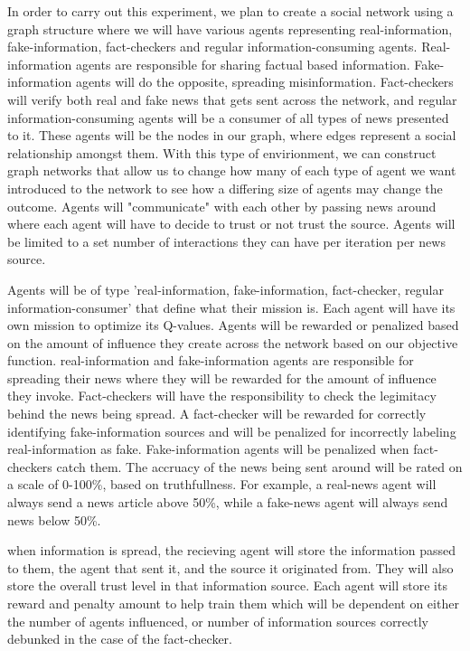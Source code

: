 \documentclass[12pt,twoside]{article}
\begin{document}
In order to carry out this experiment, we plan to create a social network using a graph structure where we will have various agents representing real-information, fake-information, fact-checkers and regular information-consuming agents. Real-information agents are responsible for sharing factual based information. Fake-information agents will do the opposite, spreading misinformation. Fact-checkers will verify both real and fake news that gets sent across the network, and regular information-consuming agents will be a consumer of all types of news presented to it. These agents will be the nodes in our graph, where edges represent a social relationship amongst them. With this type of envirionment, we can construct graph networks that allow us to change how many of each type of agent we want introduced to the network to see how a differing size of agents may change the outcome. Agents will "communicate" with each other by passing news around where each agent will have to decide to trust or not trust the source. Agents will be limited to a set number of interactions they can have per iteration per news source.

Agents will be of type 'real-information, fake-information, fact-checker, regular information-consumer' that define what their mission is. Each agent will have its own mission to optimize its Q-values. Agents will be rewarded or penalized based on the amount of influence they create across the network based on our objective function. real-information and fake-information agents are responsible for spreading their news where they will be rewarded for the amount of influence they invoke. Fact-checkers will have the responsibility to check the legimitacy behind the news being spread. A fact-checker will be rewarded for correctly identifying fake-information sources and will be penalized for incorrectly labeling real-information as fake. Fake-information agents will be penalized when fact-checkers catch them. The accruacy of the news being sent around will be rated on a scale of 0-100\%, based on truthfullness. For example, a real-news agent will always send a news article above 50\%, while a fake-news agent will always send news below 50\%.

when information is spread, the recieving agent will store the information passed to them, the agent that sent it, and the source it originated from. They will also store the overall trust level in that information source. Each agent will store its reward and penalty amount to help train them which will be dependent on either the number of agents influenced, or number of information sources correctly debunked in the case of the fact-checker.
\end{document}

